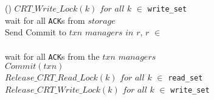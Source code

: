\begin{algorithm}[t]
{       
      \Else(){
        $CRT\_Write\_Lock(k)$ $for$ $all$ $k$ $\in$ \texttt{write\_set}  \\
        wait for all \texttt{ACK}s from $storage$  \\ 
        Send Commit to $txn$ $managers$ $in$ $r$, $r$ $\in$  \TouchedR  \\
         \\
        wait for all \texttt{ACK}s from the $txn$ $managers$  \\ 
        $Commit(txn)$ \\
        $Release\_CRT\_Read\_Lock(k)$ $for$ $all$ $k$ $\in$  \texttt{read\_set} \\
        $Release\_CRT\_Write\_Lock(k)$ $for$ $all$ $k$ $\in$  \texttt{write\_set} \\
      }  }

\end{algorithm}
